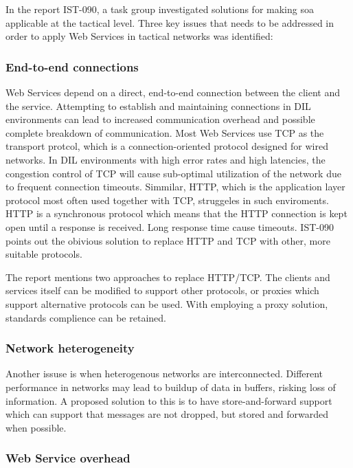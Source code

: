 \documentclass[USenglish]{ifimaster}
\begin{document}
In the report IST-090, a task group investigated solutions for making \gls{soa}
applicable at the tactical level. Three key issues that needs to be addressed in
order to apply Web Services in tactical networks was
identified\cite{IST-118}\cite{IST-090}:

\label{section:DIL-problems}

\subsubsection{End-to-end connections}

Web Services depend on a direct, end-to-end connection between the client and
the service. Attempting to establish and maintaining connections in DIL
environments can lead to increased communication overhead and possible complete
breakdown of communication. Most Web Services use TCP as the transport protcol,
which is a connection-oriented protocol designed for wired networks. In DIL
environments with high error rates and high latencies, the congestion control of
TCP will cause sub-optimal utilization of the network due to frequent connection
timeouts. Simmilar, HTTP, which is the application layer protocol most often
used together with TCP, struggeles in such enviroments. HTTP is a synchronous
protocol which means that the HTTP connection is kept open until a response is
received. Long response time cause timeouts. IST-090 points out the obivious
solution to replace HTTP and TCP with other, more suitable protocols.

The report mentions two approaches to replace HTTP/TCP. The clients and services
itself can be modified to support other protocols, or proxies which support
alternative protocols can be used. With employing a proxy solution, standards
complience can be retained.


\subsubsection{Network heterogeneity}

Another issuse is when heterogenous networks are interconnected. Different
performance in networks may lead to buildup of data in buffers, risking loss of
information. A proposed solution to this is to have store-and-forward support
which can support that messages are not dropped, but stored and forwarded when
possible.


\subsubsection{Web Service overhead}
\end{document}
